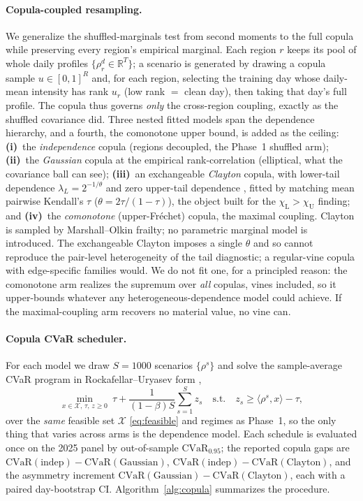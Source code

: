 \documentclass[12pt]{article}
\newcommand{\CVaR}{\mathrm{CVaR}}
\newcommand{\R}{\mathbb{R}}
\newcommand{\chiU}{\chi_{\mathrm{U}}}
\newcommand{\chiL}{\chi_{\mathrm{L}}}
\begin{document}
\paragraph{Copula-coupled resampling.} We generalize the shuffled-marginals test from
second moments to the full copula while preserving every region's empirical marginal.
Each region $r$ keeps its pool of whole daily profiles $\{\rho^d_r\in\R^T\}$; a
scenario is generated by drawing a copula sample $u\in[0,1]^R$ and, for each region,
selecting the training day whose daily-mean intensity has rank $u_r$ (low rank $=$
clean day), then taking that day's full profile. The copula thus governs \emph{only}
the cross-region coupling, exactly as the shuffled covariance did. Three nested fitted
models span the dependence hierarchy, and a fourth, the comonotone upper bound, is
added as the ceiling: \textbf{(i)}~the \emph{independence} copula (regions decoupled,
the Phase~1 shuffled arm); \textbf{(ii)}~the \emph{Gaussian} copula at the empirical
rank-correlation (elliptical, what the covariance ball can see); \textbf{(iii)}~an
exchangeable \emph{Clayton} copula, with lower-tail dependence
$\lambda_L=2^{-1/\theta}$ and zero upper-tail dependence \citep{joe2014}, fitted by
matching mean pairwise Kendall's $\tau$ ($\theta=2\tau/(1-\tau)$), the object built
for the $\chiL>\chiU$ finding; and \textbf{(iv)}~the \emph{comonotone} (upper-Fr\'echet)
copula, the maximal coupling. Clayton is sampled by Marshall--Olkin frailty; no
parametric marginal model is introduced. The exchangeable Clayton imposes a single
$\theta$ and so cannot reproduce the pair-level heterogeneity of the tail diagnostic; a
regular-vine copula with edge-specific families would. We do not fit one, for a
principled reason: the comonotone arm realizes the supremum over \emph{all} copulas,
vines included, so it upper-bounds whatever any heterogeneous-dependence model could
achieve. If the maximal-coupling arm recovers no material value, no vine can.

\paragraph{Copula CVaR scheduler.} For each model we draw $S=1000$ scenarios
$\{\rho^s\}$ and solve the sample-average CVaR program in Rockafellar--Uryasev form
\citep{rockafellar2000},
\begin{equation}
\min_{x\in\mathcal X,\,\tau,\,z\ge0}\ \tau+\frac{1}{(1-\beta)S}\sum_{s=1}^S z_s
\quad\text{s.t.}\quad z_s\ge\langle\rho^s,x\rangle-\tau,
\label{eq:saacvar}
\end{equation}
over the \emph{same} feasible set $\mathcal X$ \eqref{eq:feasible} and regimes as
Phase~1, so the only thing that varies across arms is the dependence model. Each
schedule is evaluated once on the 2025 panel by out-of-sample $\CVaR_{0.95}$; the
reported copula gaps are $\CVaR(\text{indep})-\CVaR(\text{Gaussian})$,
$\CVaR(\text{indep})-\CVaR(\text{Clayton})$, and the asymmetry increment
$\CVaR(\text{Gaussian})-\CVaR(\text{Clayton})$, each with a paired day-bootstrap CI.
Algorithm~\ref{alg:copula} summarizes the procedure.
\end{document}
